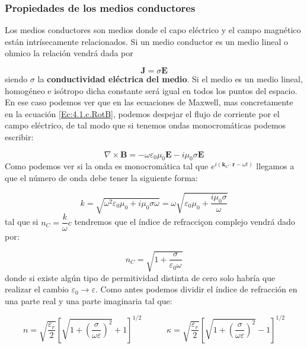 \documentclass[12pt,a4paper]{article}
\newcommand{\parentesis}[1]{\left( #1  \right)}
\newcommand{\ccorchetes}[1]{\left[ #1  \right]}
\newcommand{\tquad}{\quad \quad \quad}
\newcommand{\rota}{\nabla \times}
\newcommand{\Bn}{\mathbf{B}}
\newcommand{\En}{\mathbf{E}}
\newcommand{\Jn}{\mathbf{J}}
\newcommand{\kn}{\mathbf{k}}
\newcommand{\rn}{\mathbf{r}}
\numberwithin{equation}{section}
\numberwithin{figure}{section}
\begin{document}
\subsubsection{Propiedades de los medios conductores}

Los medios conductores son medios donde el capo eléctrico y el campo magnético están intrísecamente relacionados. Si un medio conductor es un medio lineal o ohmico la relación vendrá dada por

\begin{equation}
\Jn = \sigma \En
\end{equation}
siendo $\sigma$ la \textbf{conductividad eléctrica del medio}. Si el medio es un medio lineal, homogéneo e isótropo dicha constante será igual en todos los puntos del espacio. En ese caso podemos ver que en las ecuaciones de Maxwell, mas concretamente en la ecuación \ref{Ec:4.1.c.RotB}, podemos despejar el flujo de corriente por el campo eléctrico, de tal modo que si tenemos ondas monocromáticas podemos escribir:

\begin{equation}
\rota \Bn = - \omega \varepsilon_0 \mu_0 \En  - i \mu_0 \sigma \En
\end{equation}
Como podemos ver si la onda es monocromática tal que $e^{i (\kn_C  \cdot \rn - \omega t)}$ llegamos a que el número de onda debe tener la siguiente forma:

\begin{equation}
k = \sqrt{\omega^2 \varepsilon_0 \mu_0 + i \mu_0 \sigma \omega} = \omega \sqrt{\varepsilon_0 \mu_0 + \frac{i \mu_0 \sigma }{\omega}}
\end{equation}
tal que si $n_C = \dfrac{k}{\omega} c$ tendremos que el índice de refracciçon complejo vendrá dado por:

\begin{equation}
n_C = \sqrt{1+\dfrac{\sigma}{\varepsilon_0 \omega}}
\end{equation}
donde si existe algún tipo de permitividad distinta de cero solo habría que realizar el cambio $\varepsilon_0 \rightarrow \varepsilon$. Como antes podemos dividir el índice de refracción en una parte real y una parte imaginaria tal que:

\begin{equation}
n = \sqrt{\dfrac{\varepsilon_r}{2}} \ccorchetes{\sqrt{1+\parentesis{\dfrac{\sigma}{\omega \varepsilon}}^2} + 1}^{1/2} \tquad \kappa = \sqrt{\dfrac{\varepsilon_r}{2}} \ccorchetes{\sqrt{1+\parentesis{\dfrac{\sigma}{\omega \varepsilon}}^2} - 1}^{1/2}
\end{equation}
\end{document}
